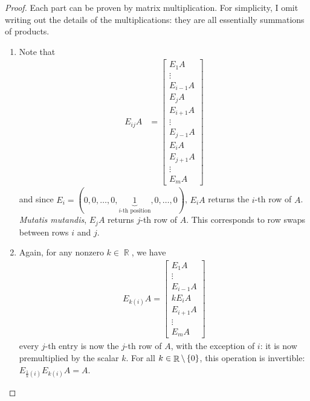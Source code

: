 \documentclass{amsart}
\theoremstyle{definition}
\theoremstyle{definition}
\DeclareMathOperator{\R}{\mathbb{R}}
\DeclareMathOperator{\1}{\mathbbm{1}}
\begin{document}
\begin{enumerate}[itemsep = 2mm]
		\begin{proof}
			Each part can be proven by matrix multiplication. For simplicity, I omit writing out the details of the multiplications: they are all essentially summations of products.
			\begin{enumerate}
				\item Note that
				\begin{align*}
				E_{ij} A &= \begin{bmatrix} E_1 A  \\ \vdots \\ E_{i-1} A \\ E_{j} A \\ E_{i+1} A \\ \vdots \\ E_{j-1} A \\ E_i A \\ E_{j+1} A \\ \vdots \\ E_m A \end{bmatrix}
				\end{align*}
				and since $E_i = (0,0,\dots, 0, \underbrace{1}_{i\text{-th position}} ,0, \dots, 0)$, $E_i A $ returns the $i$-th row of $A$. \textit{Mutatis mutandis}, $E_j A$ returns $j$-th row of $A$. This corresponds to row swaps between rows $i$ and $j$.
				
				
				\item Again, for any nonzero $k \in \R$, we have
				\begin{align*}
				E_{k(i)} A = \begin{bmatrix} E_1 A  \\ \vdots \\ E_{i-1} A \\ k E_{i} A \\ E_{i+1} A \\ \vdots \\ E_m A \end{bmatrix}
				\end{align*}
				every $j$-th entry is now the $j$-th row of $A$, with the exception of $i$: it is now premultiplied by the scalar $k$. For all $k \in \R \setminus \set{0}$, this operation is invertible: $E_{\frac{1}{k}(i)} E_{k(i)} A = A$.
				

\end{enumerate}
\end{proof}
\end{enumerate}
\end{document}
